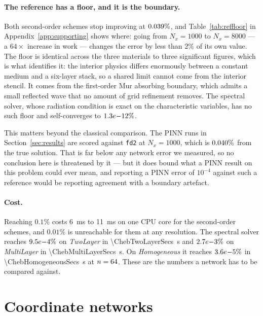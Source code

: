 \paragraph{The reference has a floor, and it is the boundary.}
Both second-order schemes stop improving at $0.039\%$, and
Table~\ref{tab:reffloor} in Appendix~\ref{app:supporting} shows where: going
from $N_x = 1000$ to $N_x = 8000$ --- a $64\times$ increase in
work --- changes the error by less than $2\%$ of its own value. The floor is
identical across the three materials to three significant figures, which is
what identifies it: the interior physics differs enormously between a constant
medium and a six-layer stack, so a shared limit cannot come from the interior
stencil. It comes from the first-order Mur absorbing boundary, which admits a
small reflected wave that no amount of grid refinement removes. The spectral
solver, whose radiation condition is exact on the characteristic variables, has
no such floor and self-converges to $1.3e{-}12\%$.

This matters beyond the classical comparison. The PINN runs in
Section~\ref{sec:results} are scored against \texttt{fd2} at $N_x = 1000$,
which is $0.040\%$ from the true solution. That is far below any network
error we measured, so no conclusion here is threatened by it --- but it does
bound what a PINN result on this problem could ever mean, and reporting a PINN
error of $10^{-4}$ against such a reference would be reporting agreement with a
boundary artefact.

\paragraph{Cost.} Reaching $0.1\%$ costs \SI{6}{\milli\second} to
\SI{11}{\milli\second} on one CPU core for the second-order schemes, and
$0.01\%$ is unreachable for them at any resolution. The spectral solver reaches
$9.5e{-}4\%$ on \emph{TwoLayer} in \SI{\ChebTwoLayerSecs}{\second} and
$2.7e{-}3\%$ on \emph{MultiLayer} in
\SI{\ChebMultiLayerSecs}{\second}. On \emph{Homogeneous} it reaches
$3.6e{-}5\%$ in \SI{\ChebHomogeneousSecs}{\second} at $n = 64$.
These are the numbers a network has to be compared against.

\section{Coordinate networks}
\label{sec:pinn}

